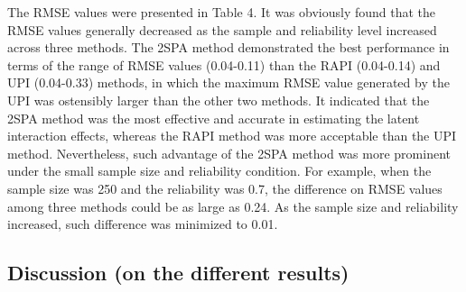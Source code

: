 \documentclass[
  man]{apa7}
\begin{document}
The RMSE values were presented in Table 4. It was obviously found that the RMSE values generally decreased as the sample and reliability level increased across three methods. The 2SPA method demonstrated the best performance in terms of the range of RMSE values (0.04-0.11) than the RAPI (0.04-0.14) and UPI (0.04-0.33) methods, in which the maximum RMSE value generated by the UPI was ostensibly larger than the other two methods. It indicated that the 2SPA method was the most effective and accurate in estimating the latent interaction effects, whereas the RAPI method was more acceptable than the UPI method. Nevertheless, such advantage of the 2SPA method was more prominent under the small sample size and reliability condition. For example, when the sample size was 250 and the reliability was 0.7, the difference on RMSE values among three methods could be as large as 0.24. As the sample size and reliability increased, such difference was minimized to 0.01.

\hypertarget{discussion-on-the-different-results}{%
\subsection{Discussion (on the different results)}\label{discussion-on-the-different-results}}
\end{document}
